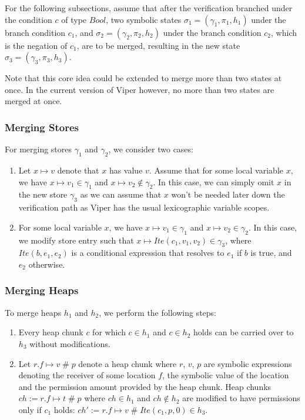 \documentclass[11pt]{article}
\DeclareMathOperator{\perm}{\mathbin{\#}}
\begin{document}
    For the following subsections, assume that after the verification branched under the condition $c$ of type $Bool$,
    two symbolic states $\sigma_1 = (\gamma_1, \pi_1, h_1)$ under the branch condition $c_1$, and
    $\sigma_2 = (\gamma_2, \pi_2, h_2)$ under the branch condition $c_2$, which is the negation
    of $c_1$, are to be merged,
    resulting in the new state $\sigma_3 = (\gamma_3, \pi_3, h_3)$.

    Note that this core idea could be extended to merge more than two states at once. In 
    the current version of Viper however,
    no more than two states are merged at once.

    \subsubsection{Merging Stores}

    For merging stores $\gamma_1$ and $\gamma_2$, we consider two cases:

    \begin{enumerate}
        \item Let $x \mapsto v$ denote that $x$ has value $v$.
            Assume that for some local variable $x$, we have $x \mapsto v_1 \in \gamma_1$ and $x \mapsto v_2 \notin \gamma_2$.
            In this case, we can simply omit $x$ in the new store $\gamma_3$ as we can assume that $x$ won't
            be needed later down the verification path as Viper has the usual lexicographic
            variable scopes.
        \item For some local variable $x$, we have $x \mapsto v_1 \in \gamma_1$ and $x \mapsto v_2 \in \gamma_2$.
            In this case, we modify store entry such that $x \mapsto Ite(c_1, v_1, v_2) \in \gamma_3$,
            where $Ite(b, e_1, e_2)$ is a conditional expression that resolves to $e_1$ if $b$ is true, and $e_2$ otherwise.
    \end{enumerate}

    \subsubsection{Merging Heaps} \label{merging-the-heap}

    To merge heaps $h_1$ and $h_2$, we perform the following steps:

    \begin{enumerate}
        \item Every heap chunk $c$ for which $c \in h_1$ and $c \in h_2$ holds can be carried over to $h_3$
            without modifications.
        \item Let $r.f \mapsto v \perm p$ denote a heap chunk where $r$, $v$, $p$ are symbolic expressions
            denoting the receiver of some location $f$, the symbolic value of the location and the permission
            amount provided by the heap chunk.
            Heap chunks $ch := r.f \mapsto t \perm p$ where $ch \in h_1$ and $ch \notin h_2$ are modified to
            have permissions only if $c_1$ holds: $ch' := r.f \mapsto v \perm Ite(c_1, p, 0) \in h_3$.
    \end{enumerate}
\end{document}
